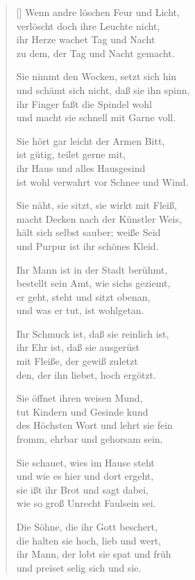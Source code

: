 \begin{multicols}{2}
\begin{verse}[\versewidth]
 Wenn andre löschen Feur und Licht,\\
verlöscht doch ihre Leuchte nicht,\\
ihr Herze wachet Tag und Nacht\\
zu dem, der Tag und Nacht gemacht.

 Sie nimmt den Wocken, setzt sich hin\\
und schämt sich nicht, daß sie ihn spinn,\\
ihr Finger faßt die Spindel wohl\\
und macht sie schnell mit Garne voll.

 Sie hört gar leicht der Armen Bitt,\\
ist gütig, teilet gerne mit,\\
ihr Haus und alles Hausgesind\\
ist wohl verwahrt vor Schnee und Wind.

 Sie näht, sie sitzt, sie wirkt mit Fleiß,\\
macht Decken nach der Künstler Weis,\\
hält sich selbst sauber; weiße Seid\\
und Purpur ist ihr schönes Kleid.

 Ihr Mann ist in der Stadt berühmt,\\
bestellt sein Amt, wie sichs geziemt,\\
er geht, steht und sitzt obenan,\\
und was er tut, ist wohlgetan.

 Ihr Schmuck ist, daß sie reinlich ist,\\
ihr Ehr ist, daß sie ausgerüst\\
mit Fleiße, der gewiß zuletzt\\
den, der ihn liebet, hoch ergötzt.

 Sie öffnet ihren weisen Mund,\\
tut Kindern und Gesinde kund\\
des Höchsten Wort und lehrt sie fein\\
fromm, ehrbar und gehorsam sein.

 Sie schauet, wies im Hause steht\\
und wie es hier und dort ergeht,\\
sie ißt ihr Brot und sagt dabei,\\
wie so groß Unrecht Faulsein sei.

 Die Söhne, die ihr Gott beschert,\\
die halten sie hoch, lieb und wert,\\
ihr Mann, der lobt sie spat und früh\\
und preiset selig sich und sie.


\end{verse}
\end{multicols}
